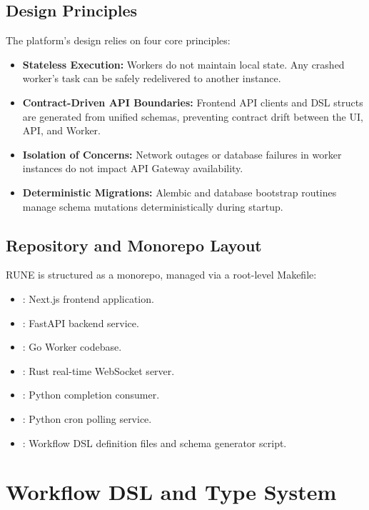\documentclass[12pt]{report}
\begin{document}
\section{Design Principles}
The platform's design relies on four core principles:
\begin{itemize}
    \item \textbf{Stateless Execution:} Workers do not maintain local state. Any crashed worker's task can be safely redelivered to another instance.
    \item \textbf{Contract-Driven API Boundaries:} Frontend API clients and DSL structs are generated from unified schemas, preventing contract drift between the UI, API, and Worker.
    \item \textbf{Isolation of Concerns:} Network outages or database failures in worker instances do not impact API Gateway availability.
    \item \textbf{Deterministic Migrations:} Alembic and database bootstrap routines manage schema mutations deterministically during startup.
\end{itemize}

\section{Repository and Monorepo Layout}
RUNE is structured as a monorepo, managed via a root-level Makefile:
\begin{itemize}
    \item {}: Next.js frontend application.
    \item {}: FastAPI backend service.
    \item {}: Go Worker codebase.
    \item {}: Rust real-time WebSocket server.
    \item {}: Python completion consumer.
    \item {}: Python cron polling service.
    \item {}: Workflow DSL definition files and schema generator script.
\end{itemize}

\chapter{Workflow DSL and Type System}
\label{ch:workflow_dsl}
\end{document}
